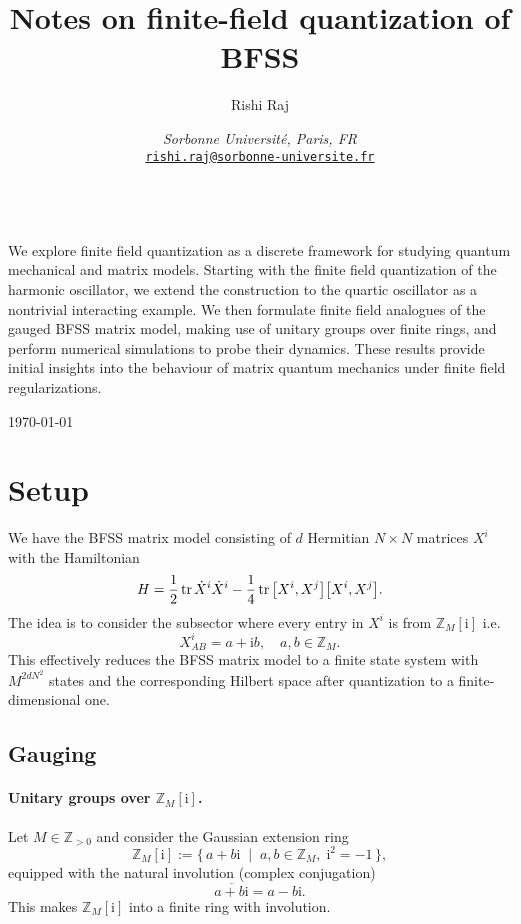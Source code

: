 \documentclass[10pt, a4paper]{article}
\title{Notes on finite-field quantization of BFSS}
\author{Rishi Raj}
\date{
    \noindent\textit{Sorbonne Université, Paris, FR}\\[0.2cm]
    \href{mailto:rishiraj.1012exp@gmail.com}{\texttt{rishi.raj@sorbonne-universite.fr}}
}
\newcommand{\ii}{\mathrm{i}}
\numberwithin{equation}{section}
\renewenvironment{abstract}
 {\par\noindent\textbf{\abstractname}\ \ignorespaces\\[1ex]}
 {\par\medskip}
\begin{document}
\thispagestyle{empty}
\maketitle

\begin{abstract}
  We explore finite field quantization as a discrete framework for studying quantum mechanical and matrix models. 
  Starting with the finite field quantization of the harmonic oscillator, we extend the construction to the quartic oscillator as a nontrivial interacting example. 
  We then formulate finite field analogues of the gauged BFSS matrix model, making use of unitary groups over finite rings, and perform numerical simulations to probe their dynamics. 
  These results provide initial insights into the behaviour of matrix quantum mechanics under finite field regularizations.
\end{abstract}

\noindent\today

\tableofcontents

\setlength{\parindent}{1ex}
\setlength{\parskip}{2ex}
\raggedright

\section{Setup}
We have the BFSS matrix model consisting of $d$ Hermitian $N \times N$ matrices $X^i$ with the Hamiltonian
\begin{equation}
  H = \frac{1}{2} \tr \dot{X}^i \dot{X}^i - \frac{1}{4} \tr \comm{X^i}{X^j} \comm{X^i}{X^j}.
\end{equation}
The idea is to consider the subsector where every entry in $X^i$ is from $\mathbb{Z}_M[\ii]$ i.e.
\begin{equation}
  X^i_{A B} = a + \ii b, \quad a, b \in \mathbb{Z}_M.
\end{equation}
This effectively reduces the BFSS matrix model to a finite state system with $M^{2d N^2}$ states and the corresponding Hilbert space after quantization to a finite-dimensional one.

\subsection{Gauging}
\paragraph{Unitary groups over $\mathbb{Z}_M[\ii]$.} 
Let $M \in \mathbb{Z}_{>0}$ and consider the Gaussian extension ring
\[
  \mathbb{Z}_M[\ii] := \{\, a + b \ii \;\;|\;\; a,b \in \mathbb{Z}_M, \; \ii^2 = -1 \,\},
\]
equipped with the natural involution (complex conjugation) 
\[
  \overline{a+b\ii} = a - b\ii.
\]
This makes $\mathbb{Z}_M[\ii]$ into a finite ring with involution.
\end{document}
